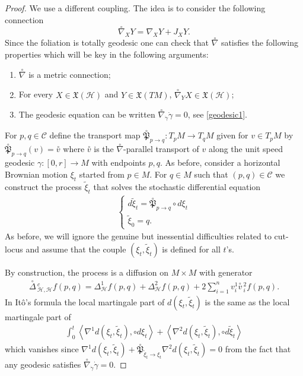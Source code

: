 \documentclass[10pt,a4paper]{amsart}
\newcommand{\Ho}{\mathcal H}
\begin{document}
\begin{proof}
We use a  different coupling. The idea is to consider the following connection
\[
\overset{\circ}{\nabla}_X Y=\nabla_XY +J_XY.
\]
Since the foliation is totally geodesic one can check that $\overset{\circ}{\nabla}$ satisfies the following properties which will be key in the following arguments:
\begin{enumerate}
\item $\overset{\circ}{\nabla}$ is a metric connection;
\item For every $X \in \mathfrak{X}(\Ho)$ and $Y \in \mathfrak{X}(TM)$, $\overset{\circ}{\nabla}_Y X \in \mathfrak{X}(\Ho)$;
\item The geodesic equation can be written $\overset{\circ}{\nabla}_{\dot \gamma} \dot\gamma=0$, see \eqref{geodesic1}.
\end{enumerate}
For $p,q \in \mathcal{C}$ define the transport map $\overset{\circ}{\mathfrak{P}}_{p \to q}:T_pM \to T_qM$ given for $v \in T_pM$ by $\overset{\circ}{\mathfrak{P}}_{p \to q}(v)=\overset{\circ}{v}$ where $\overset{\circ}{v}$ is the $\overset{\circ}{\nabla}$-parallel transport of $v$ along the unit speed geodesic $\gamma:[0,r] \to M$ with endpoints $p,q$. As before, consider  a horizontal Brownian motion $\xi_t$ started from $p \in M$. For $q \in M$ such that $(p,q) \in \mathcal{C}$ we construct the process $\tilde{\xi}_t$ that solves the stochastic differential equation
\begin{align*}
\begin{cases}
d\tilde{\xi}_t=\overset{\circ}{\mathfrak{P}}_{p \to q} \circ d\xi_t \\
\tilde{\xi}_0=q.
\end{cases}
\end{align*}
As before, we will  ignore the genuine but inessential difficulties related to cut-locus and assume that the couple $(\xi_t,\tilde{\xi}_t)$ is defined for all $t$'s. 

By construction, the process is a diffusion on $M \times M$ with generator
\begin{align*}
\overset{\circ}{\Delta}\,^c_{\Ho,\Ho} f (p,q)=\Delta^1_{\Ho} f (p,q)+\Delta^2_{\Ho} f (p,q) +2 \sum_{i=1}^n v_i^1 \overset{\circ}{v}\,^2_i f(p,q).
\end{align*}
In It\^o's formula the local martingale part of $d(\xi_t,\tilde{\xi}_t)$ is the same as the local martingale part of
\begin{align}\label{quadratic part }
\int_0^t \left\langle \nabla^1 d(\xi_t,\tilde{\xi}_t), \circ d\xi_t \right\rangle +\left\langle \nabla^2 d(\xi_t,\tilde{\xi}_t), \circ d\tilde{\xi}_t \right\rangle
\end{align}
which vanishes since $\nabla^1 d(\xi_t,\tilde{\xi}_t) +\overset{\circ}{\mathfrak{P}}_{\tilde{\xi}_t \to \xi_t}\nabla^2 d(\xi_t,\tilde{\xi}_t)=0$ from the fact that any geodesic satisfies $\overset{\circ}{\nabla}_{\dot \gamma} \dot\gamma=0$.



\end{proof}
\end{document}
